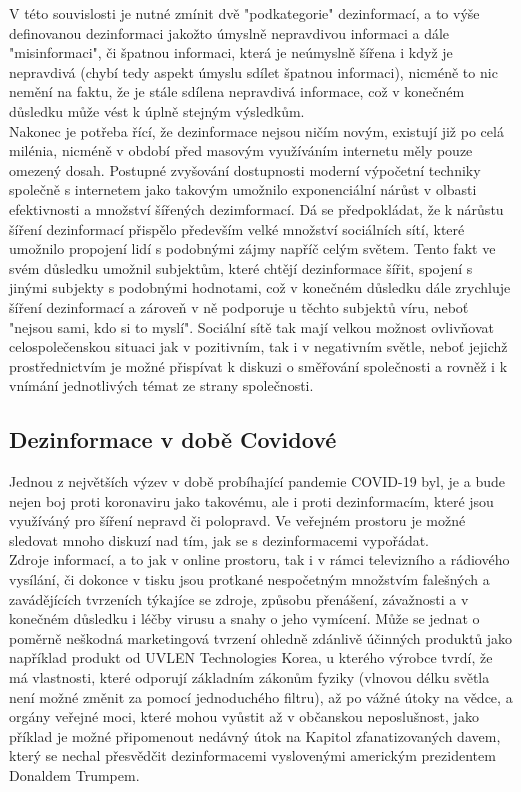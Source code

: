 V této souvislosti je nutné zmínit dvě "podkategorie" dezinformací, a to výše definovanou dezinformaci jakožto úmyslně nepravdivou informaci a dále "misinformaci", či špatnou informaci, která je neúmyslně šířena i když je nepravdivá (chybí tedy aspekt úmyslu sdílet špatnou informaci), nicméně to nic nemění na faktu, že je stále sdílena nepravdivá informace, což v konečném důsledku může vést k úplně stejným výsledkům.\\

Nakonec je potřeba řící, že dezinformace nejsou ničím novým, existují již po celá milénia, nicméně v období před masovým využíváním internetu měly pouze omezený dosah. Postupné zvyšování dostupnosti moderní výpočetní techniky společně s internetem jako takovým umožnilo exponenciální nárůst v olbasti efektivnosti a množství šířených dezimformací. Dá se předpokládat, že k nárůstu šíření dezinformací přispělo především velké množství sociálních sítí, které umožnilo propojení lidí s podobnými zájmy napříč celým světem. Tento fakt ve svém důsledku umožnil subjektům, které chtějí dezinformace šířit, spojení s jinými subjekty s podobnými hodnotami, což v konečném důsledku dále zrychluje šíření dezinformací a zároveň v ně podporuje u těchto subjektů víru, neboť "nejsou sami, kdo si to myslí". Sociální sítě tak mají velkou možnost ovlivňovat celospolečenskou situaci jak v pozitivním, tak i v negativním světle, neboť jejichž prostřednictvím je možné přispívat k diskuzi o směřování společnosti a rovněž i k vnímání jednotlivých témat ze strany společnosti.

\subsection{Dezinformace v době Covidové}

Jednou z největších výzev v době probíhající pandemie COVID-19 byl, je a bude nejen boj proti koronaviru jako takovému, ale i proti dezinformacím, které jsou využíváný pro šíření nepravd či polopravd. Ve veřejném prostoru je možné sledovat mnoho diskuzí nad tím, jak se s dezinformacemi vypořádat.\\

Zdroje informací, a to jak v online prostoru, tak i v rámci televizního a rádiového vysílání, či dokonce v tisku jsou protkané nespočetným množstvím falešných a zavádějících tvrzeních týkajíce se zdroje, způsobu přenášení, závažnosti a v konečném důsledku i léčby virusu a snahy o jeho vymícení. Může se jednat o poměrně neškodná marketingová tvrzení ohledně zdánlivě účinných produktů jako například produkt od UVLEN \textregistered Technologies Korea\cite{uvlen__uvlen_nodate}, u kterého výrobce tvrdí, že má vlastnosti, které odporují základním zákonům fyziky (vlnovou délku světla není možné změnit za pomocí jednoduchého filtru), až po vážné útoky na vědce, a orgány veřejné moci, které mohou vyůstit až v občanskou neposlušnost, jako příklad je možné připomenout nedávný útok na Kapitol zfanatizovaných davem, který se nechal přesvědčit dezinformacemi vyslovenými americkým prezidentem Donaldem Trumpem.\\

